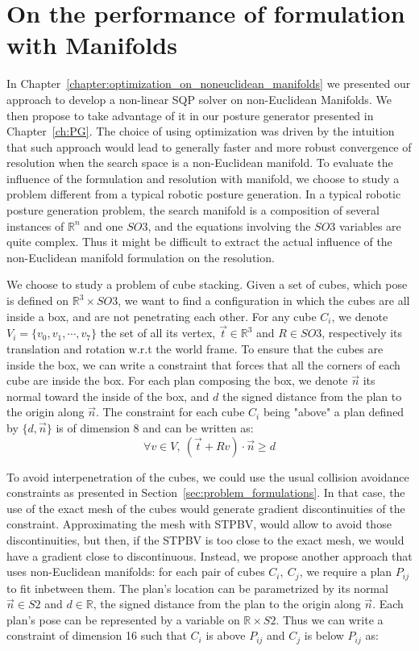 \section{On the performance of formulation with Manifolds}
\label{sec:On_the_performance_of_formulation_with_manifolds}

In Chapter~\ref{chapter:optimization_on_noneuclidean_manifolds} we presented our approach to develop a non-linear SQP solver on non-Euclidean Manifolds.
We then propose to take advantage of it in our posture generator presented in Chapter~\ref{ch:PG}.
The choice of using optimization was driven by the intuition that such approach would lead to generally faster and more robust convergence of resolution when the search space is a non-Euclidean manifold.
To evaluate the influence of the formulation and resolution with manifold, we choose to study a problem different from a typical robotic posture generation.
In a typical robotic posture generation problem, the search manifold is a composition of several instances of $\mathbb{R}^n$ and one $SO3$, and the equations involving the $SO3$ variables are quite complex.
Thus it might be difficult to extract the actual influence of the non-Euclidean manifold formulation on the resolution.

We choose to study a problem of cube stacking.
Given a set of cubes, which pose is defined on $\mathbb{R}^3 \times SO3$, we want to find a configuration in which the cubes are all inside a box, and are not penetrating each other.
For any cube $C_i$, we denote $V_i = \{v_0, v_1, \cdots, v_7\}$  the set of all its vertex, $\vec{t}\in\mathbb{R}^3$ and $R\in SO3$, respectively its translation and rotation w.r.t the world frame.
To ensure that the cubes are inside the box, we can write a constraint that forces that all the corners of each cube are inside the box.
For each plan composing the box, we denote $\vec{n}$ its normal toward the inside of the box, and $d$ the signed distance from the plan to the origin along $\vec{n}$.
The constraint for each cube $C_i$ being "above" a plan defined by $\{d, \vec{n}\}$ is of dimension 8 and can be written as:
\begin{equation}
  \forall v\in V,\ (\vec{t} + R v)\cdot \vec{n} \geq d
\end{equation}

To avoid interpenetration of the cubes, we could use the usual collision avoidance constraints as presented in Section~\ref{sec:problem_formulations}.
In that case, the use of the exact mesh of the cubes would generate gradient discontinuities of the constraint.
Approximating the mesh with STPBV, would allow to avoid those discontinuities, but then, if the STPBV is too close to the exact mesh, we would have a gradient close to discontinuous.
Instead, we propose another approach that uses non-Euclidean manifolds: for each pair of cubes $C_i,\ C_j$, we require a plan $P_{ij}$ to fit inbetween them.
The plan's location can be parametrized by its normal $\vec{n}\in S2$ and $d\in\mathbb{R}$, the signed distance from the plan to the origin along $\vec{n}$.
Each plan's pose can be represented by a variable on $\mathbb{R} \times S2$.
Thus we can write a constraint of dimension 16 such that $C_i$ is above $P_{ij}$ and $C_j$ is below $P_{ij}$ as:

